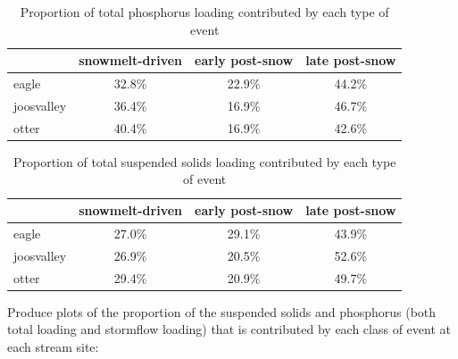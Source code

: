 \documentclass[12pt]{article}
\begin{document}
\begin{table}[h]
\begin{center}
\begin{tabular}{lccc}
  & snowmelt-driven & early post-snow & late post-snow \\ 
  \hline
eagle & 32.8\% & 22.9\% & 44.2\% \\ 
  joosvalley & 36.4\% & 16.9\% & 46.7\% \\ 
  otter & 40.4\% & 16.9\% & 42.6\% \\ 
  \end{tabular}
\caption{Proportion of total phosphorus loading contributed by each type of event}
\label{tab:ptot}
\end{center}
\end{table}
\begin{table}[h]
\begin{center}
\begin{tabular}{lccc}
  & snowmelt-driven & early post-snow & late post-snow \\ 
  \hline
eagle & 27.0\% & 29.1\% & 43.9\% \\ 
  joosvalley & 26.9\% & 20.5\% & 52.6\% \\ 
  otter & 29.4\% & 20.9\% & 49.7\% \\ 
  \end{tabular}
\caption{Proportion of total suspended solids loading contributed by each type of event}
\label{tab:stot}
\end{center}
\end{table}








Produce plots of the proportion of the suspended solids and phosphorus (both total loading and stormflow loading) that is contributed by each class of event at each stream site:\\
\end{document}
